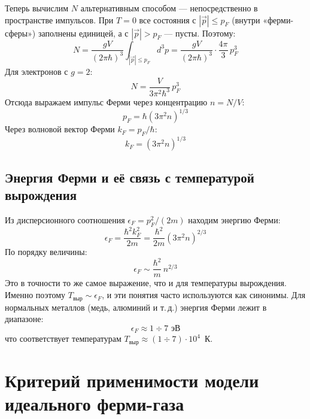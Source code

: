 \documentclass[../general/general]{subfiles}
\begin{document}
Теперь вычислим $N$ альтернативным способом — непосредственно в пространстве импульсов. При $T = 0$ все состояния с $|\vec{p}| \leq p_F$ (внутри «ферми-сферы») заполнены единицей, а с $|\vec{p}| > p_F$ — пусты. Поэтому:
\begin{equation}
    N = \frac{g V}{(2\pi\hbar)^3} \int_{|\vec{p}| \leq p_F} d^3p = \frac{g V}{(2\pi\hbar)^3} \cdot \frac{4\pi}{3}\, p_F^3
\end{equation}
Для электронов с $g = 2$:
\begin{equation}
    N = \frac{V}{3\pi^2 \hbar^3}\, p_F^3
\end{equation}
Отсюда выражаем импульс Ферми через концентрацию $n = N/V$:
\begin{equation}
    p_F = \hbar\!\left( 3\pi^2 n \right)^{1/3}
\end{equation}
Через волновой вектор Ферми $k_F = p_F / \hbar$:
\begin{equation}
    k_F = \left( 3\pi^2 n \right)^{1/3}
\end{equation}

\subsection{Энергия Ферми и её связь с температурой вырождения}

Из дисперсионного соотношения $\epsilon_F = p_F^2 / (2m)$ находим энергию Ферми:
\begin{equation}
    \epsilon_F = \frac{\hbar^2 k_F^2}{2m} = \frac{\hbar^2}{2m}\!\left( 3\pi^2 n \right)^{2/3}
\end{equation}
По порядку величины:
\begin{equation}
    \epsilon_F \sim \frac{\hbar^2}{m}\, n^{2/3}
\end{equation}
Это в точности то же самое выражение, что и для температуры вырождения. Именно поэтому $T_{\text{выр}} \sim \epsilon_F$, и эти понятия часто используются как синонимы. Для нормальных металлов (медь, алюминий и т.\,д.) энергия Ферми лежит в диапазоне:
\begin{equation}
    \epsilon_F \approx 1 \div 7 \text{ эВ}
\end{equation}
что соответствует температурам $T_{\text{выр}} \approx (1\div 7) \cdot 10^4$~К.



\section{Критерий применимости модели идеального ферми-газа}
\end{document}
